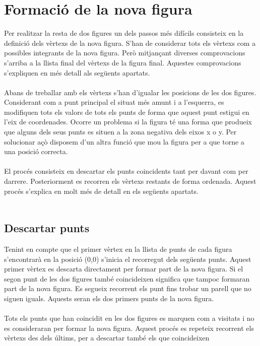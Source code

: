 \documentclass{article}
\begin{document}
\section{Formació de la nova figura}
Per realitzar la resta de dos figures un dels passos més difícils consisteix en la definició dels vèrtexs de la nova figura.
S'han de considerar tots els vèrtexs com a possibles integrants de la nova figura.
Però mitjançant diverses comprovacions s'arriba a la llista final del vèrtexs de la figura final.
Aquestes comprovacions s'expliquen en més detall als següents apartats.
\\
\\
Abans de treballar amb els vèrtexs s'han d'igualar les posicions de les dos figures.
Considerant com a punt principal el situat més amunt i a l'esquerra, es modifiquen tots els valors de tots els punts de forma que aquest punt estigui en l'eix de coordenades.
Ocorre un problema si la figura té una forma que produeix que alguns dels seus punts es situen a la zona negativa dels eixos x o y.
Per solucionar açò disposem d'un altra funció que mou la figura per a que torne a una posició correcta.
\\
\\
El procés consisteix en descartar els punts coincidents tant per davant com per darrere.
Posteriorment es recorren els vèrtexs restants de forma ordenada.
Aquest procés s'explica en molt més de detall en els següents apartats.
\\
\\
\subsection{Descartar punts}
Tenint en compte que el primer vèrtex en la llista de punts de cada figura s'encontrarà en la posició (0,0) s'inicia el recorregut dels següents punts.
Aquest primer vèrtex es descarta directament per formar part de la nova figura.
Si el segon punt de les dos figures també coincideixen significa que tampoc formaran part de la nova figura.
Es segueix recorrent els punt fins trobar un parell que no siguen iguals.
Aquests seran els dos primers punts de la nova figura.
\\
\\
Tots els punts que han coincidit en les dos figures es marquen com a visitats i no es consideraran per formar la nova figura. 
Aquest procés es repeteix recorrent els vèrtexs des dels últims, per a descartar també els que coincideixen  
\\
\\
\end{document}
